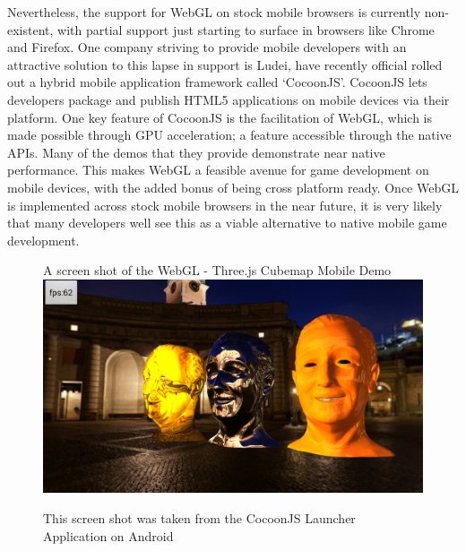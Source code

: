 \documentclass[final]{cmpreport}
\begin{document}
Nevertheless, the support for WebGL on stock mobile browsers is currently non-existent, with partial support just starting to surface in browsers like Chrome and Firefox. One company striving to provide mobile developers with an attractive solution to this lapse in support is Ludei, have recently official rolled out a hybrid mobile application framework called `CocoonJS'. CocoonJS lets developers package and publish HTML5 applications on mobile devices via their platform. One key feature of CocoonJS is the facilitation of WebGL, which is made possible through GPU acceleration; a feature accessible through the native APIs. Many of the demos that they provide demonstrate near native performance. This makes WebGL a feasible avenue for game development on mobile devices, with the added bonus of being cross platform ready. Once WebGL is implemented across stock mobile browsers in the near future, it is very likely that many developers well see this as a viable alternative to native mobile game development.

\begin{figure}[h!]{A screen shot of the WebGL - Three.js Cubemap Mobile Demo}
  \includegraphics[width=1.0\textwidth]{webgl.png}
  \begin{tablenotes}
    \item This screen shot was taken from the CocoonJS Launcher Application on Android\footnotemark
  \end{tablenotes}
\end{figure}

\end{document}
